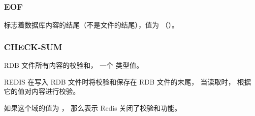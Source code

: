 \documentclass[a4paper,11pt,english]{sphinxmanual}
\begin{document}
\subsubsection{EOF}
\label{internal/rdb:eof}
标志着数据库内容的结尾（不是文件的结尾），值为  （）。


\subsubsection{CHECK-SUM}
\label{internal/rdb:check-sum}
RDB 文件所有内容的校验和，
一个  类型值。

REDIS 在写入 RDB 文件时将校验和保存在 RDB 文件的末尾，
当读取时，
根据它的值对内容进行校验。

如果这个域的值为  ，
那么表示 Redis 关闭了校验和功能。
\end{document}

